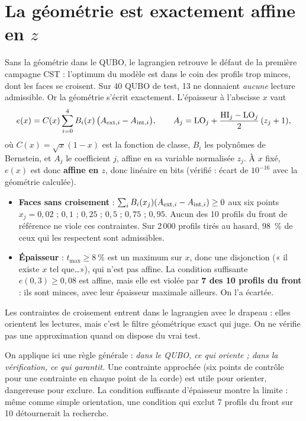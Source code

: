 \section{La géométrie est exactement affine en $z$}
Sans la géométrie dans le QUBO, le lagrangien retrouve le défaut de la première campagne CST : l'optimum du modèle est dans le coin des profils trop minces, dont les faces se croisent. Sur 40 QUBO de test, 13 ne donnaient \emph{aucune} lecture admissible. Or la géométrie s'écrit exactement. L'épaisseur à l'abscisse $x$ vaut
\[ e(x)=C(x)\sum_{i=0}^{4}B_i(x)\,\big(A_{{\rm ext},i}-A_{{\rm int},i}\big),\qquad A_j=\mathrm{LO}_j+\frac{\mathrm{HI}_j-\mathrm{LO}_j}{2}\,(z_j+1), \]
où $C(x)=\sqrt x(1-x)$ est la fonction de classe, $B_i$ les polynômes de Bernstein, et $A_j$ le coefficient $j$, affine en sa variable normalisée $z_j$. À $x$ fixé, $e(x)$ est donc \textbf{affine en $z$}, donc linéaire en bits (vérifié : écart de $10^{-16}$ avec la géométrie calculée).
\begin{itemize}
\item \textbf{Faces sans croisement} : $\sum_iB_i(x_j)(A_{{\rm ext},i}-A_{{\rm int},i})\ge0$ aux six points $x_j=0{,}02$ ; $0{,}1$ ; $0{,}25$ ; $0{,}5$ ; $0{,}75$ ; $0{,}95$. Aucun des 10 profils du front de référence ne viole ces contraintes. Sur 2\,000 profils tirés au hasard, 98~\% de ceux qui les respectent sont admissibles.
\item \textbf{Épaisseur} : $t_{\max}\ge8~\%$ est un maximum sur $x$, donc une disjonction (« il existe $x$ tel que\dots »), qui n'est pas affine. La condition suffisante $e(0{,}3)\ge0{,}08$ est affine, mais elle est violée par \textbf{7 des 10 profils du front} : ils sont minces, avec leur épaisseur maximale ailleurs. On l'a écartée.
\end{itemize}
Les contraintes de croisement entrent dans le lagrangien avec le drapeau  : elles orientent les lectures, mais c'est le filtre géométrique exact qui juge. On ne vérifie pas une approximation quand on dispose du vrai test.

\begin{projet}
On applique ici une règle générale : \emph{dans le QUBO, ce qui oriente ; dans la vérification, ce qui garantit.} Une contrainte approchée (six points de contrôle pour une contrainte en chaque point de la corde) est utile pour orienter, dangereuse pour exclure. La condition suffisante d'épaisseur montre la limite : même comme simple orientation, une condition qui exclut 7 profils du front sur 10 détournerait la recherche.
\end{projet}

